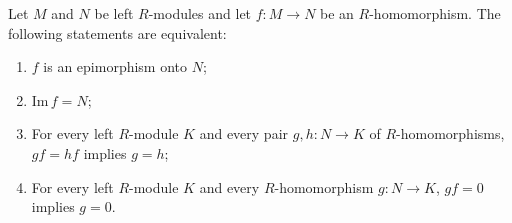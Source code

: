 Let $M$ and $N$ be left $R$-modules and let $f: M \to N$ be an $R$-homomorphism. The following statements are equivalent:
\begin{enumerate}
  \item[(a)] $f$ is an epimorphism onto $N$;
  \item[(b)] $\text{Im}\, f = N$;
  \item[(c)] For every left $R$-module $K$ and every pair $g, h: N \to K$ of $R$-homomorphisms, $gf = hf$ implies $g = h$;
  \item[(d)] For every left $R$-module $K$ and every $R$-homomorphism $g: N \to K$, $gf = 0$ implies $g = 0$.
\end{enumerate}
